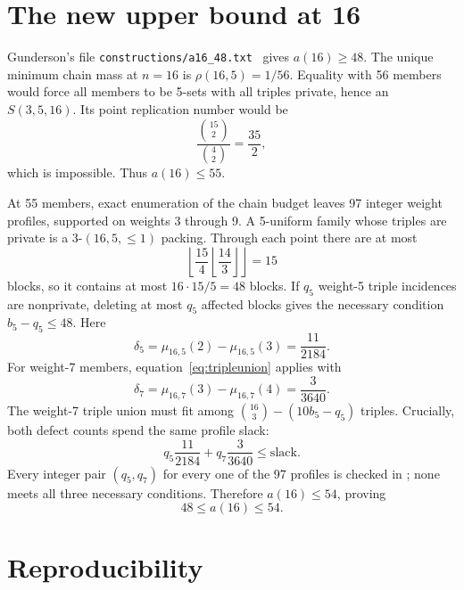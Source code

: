 \documentclass[11pt]{article}
\newcommand{\binomc}[2]{\binom{#1}{#2}}
\begin{document}
\section{The new upper bound at 16}

Gunderson's file \texttt{constructions/a16\_48.txt}~\cite{gunderson-a286874}
gives $a(16)\geq48$.  The unique
minimum chain mass at $n=16$ is $\rho(16,5)=1/56$.  Equality with 56 members
would force all members to be 5-sets with all triples private, hence an
$S(3,5,16)$.  Its point replication number would be
\[
 \frac{\binomc{15}2}{\binomc42}=\frac{35}{2},
\]
which is impossible.  Thus $a(16)\leq55$.

At 55 members, exact enumeration of the chain budget leaves 97 integer weight
profiles, supported on weights 3 through 9.  A 5-uniform family whose triples
are private is a $3$-$(16,5,\leq1)$ packing.  Through each point there are at
most
\[
 \left\lfloor\frac{15}{4}
 \left\lfloor\frac{14}{3}\right\rfloor\right\rfloor=15
\]
blocks, so it contains at most $16\cdot15/5=48$ blocks.  If $q_5$
weight-5 triple incidences are nonprivate, deleting at most $q_5$ affected
blocks gives the necessary condition $b_5-q_5\leq48$.  Here
\[
 \delta_5=\mu_{16,5}(2)-\mu_{16,5}(3)=\frac{11}{2184}.
\]
For weight-7 members, equation~\eqref{eq:tripleunion} applies with
\[
 \delta_7=\mu_{16,7}(3)-\mu_{16,7}(4)=\frac3{3640}.
\]
The weight-7 triple union must fit among
$\binomc{16}3-(10b_5-q_5)$ triples.  Crucially, both defect counts spend the
same profile slack:
\[
 q_5\frac{11}{2184}+q_7\frac3{3640}\leq\text{slack}.
\]
Every integer pair $(q_5,q_7)$ for every one of the 97 profiles is checked in
; none meets all three necessary
conditions.  Therefore $a(16)\leq54$, proving
\[
 48\leq a(16)\leq54.
\]

\section{Reproducibility}
\end{document}
